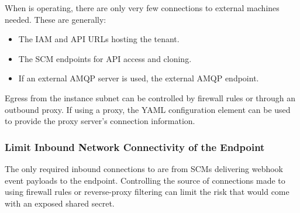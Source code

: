 When \cxoneflow is operating, there are only very few connections to external machines
needed.  These are generally:

\begin{itemize}
  \item The IAM and API URLs hosting the \cxone tenant.
  \item The SCM endpoints for API access and cloning.
  \item If an external AMQP server is used, the external AMQP endpoint.
\end{itemize}

Egress from the \cxoneflow instance subnet can be controlled by firewall rules or
through an outbound proxy.  If using a proxy, the 
YAML configuration element can be used to provide the proxy server's connection information.

\subsubsection{Limit Inbound Network Connectivity of the \cxoneflowtext\space Endpoint}

The only required inbound connections to \cxoneflow are from SCMs delivering webhook event
payloads to the \cxoneflow endpoint.  Controlling the source of connections made to \cxoneflow using firewall rules
or reverse-proxy filtering can limit the risk that would come with an exposed shared secret.
